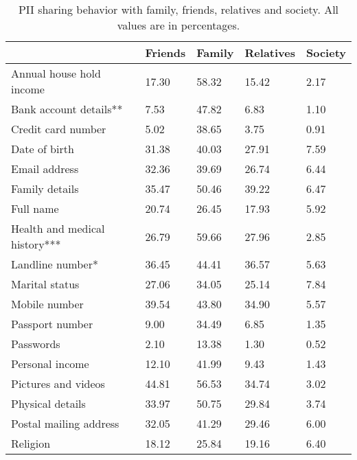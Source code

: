 \begin{table}[!htbp]
\small
\vspace{-4mm}
\caption{\small{PII sharing behavior with family, friends, relatives and society. All values are in percentages. }} \setlength{\extrarowheight}{2pt}
\begin{tabular}{p{2.1cm}p{1cm}p{1 cm}p{1.2cm}p{0.9cm}}
\midrule
\midrule
          & \bf{Friends} & \bf{Family} & \bf{Relatives} & \bf{Society}\\
  \midrule
   \raggedright Annual house hold income & 17.30  & 58.32 & 15.42 & 2.17\\
\rowcolor {gray!15 } 
   \raggedright Bank account details** & 7.53  & 47.82 & 6.83  & 1.10\\
\raggedright Credit card number & 5.02  & 38.65 & 3.75  & 0.91\\
\rowcolor {gray!15 } 
  \raggedright  Date of birth & 31.38 & 40.03 & 27.91 & 7.59\\
\raggedright Email address & 32.36 & 39.69 & 26.74 & 6.44\\
\rowcolor {gray!15 } 
   \raggedright Family details & 35.47 & 50.46 & 39.22 & 6.47\\
\raggedright Full name & 20.74 & 26.45 & 17.93 & 5.92\\
\rowcolor {gray!15 } 
    \raggedright Health and medical history*** & 26.79 & 59.66 & 27.96 & 2.85\\
\raggedright  Landline number* & 36.45 & 44.41 & 36.57 & 5.63\\
\rowcolor {gray!15 } 
  \raggedright  Marital status & 27.06 & 34.05 & 25.14 & 7.84\\
\raggedright  Mobile number & 39.54 & 43.80  & 34.90  & 5.57\\
\rowcolor {gray!15 } 
  \raggedright  Passport number & 9.00 & 34.49 & 6.85  & 1.35\\
\raggedright  Passwords & 2.10   & 13.38 & 1.30   & 0.52\\
\rowcolor {gray!15 } 
   \raggedright Personal income & 12.10  & 41.99 & 9.43  & 1.43\\
\raggedright Pictures and videos  & 44.81 & 56.53 & 34.74 & 3.02\\
\rowcolor {gray!15 } 
   \raggedright Physical details & 33.97 & 50.75 & 29.84 & 3.74\\
\raggedright Postal mailing address & 32.05 & 41.29 & 29.46 & 6.00\\
\rowcolor {gray!15 } 
  \raggedright  Religion & 18.12 & 25.84 & 19.16 & 6.40\\

\end{tabular}
\end{table}
